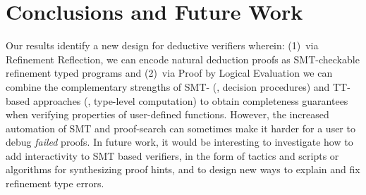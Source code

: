 \section{Conclusions and Future Work}

Our results identify a new design for
deductive verifiers wherein:
%
(1)~via Refinement Reflection, 
we can encode natural deduction 
proofs as SMT-checkable refinement 
typed programs and
%
(2)~via Proof by Logical Evaluation
we can combine the complementary
strengths of SMT- (\ie, decision procedures)
and TT- based approaches (\ie, type-level computation)
to obtain completeness guarantees 
when verifying properties 
of user-defined functions.
%
However, the increased automation 
of SMT and proof-search can 
sometimes make it harder for 
a user to debug \emph{failed} proofs.
%
In future work, it would be 
interesting to investigate how 
to add interactivity to SMT based 
verifiers, in the form of tactics 
and scripts or algorithms for 
synthesizing proof hints, and to 
design new ways to explain and 
fix refinement type errors.

